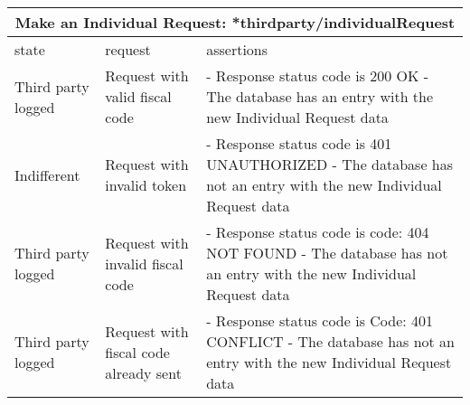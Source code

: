 \begin{center}
	\begin{tabular}{|p{}|p{}|p{}|}
		\hline
		\multicolumn{3}{c}{Make an Individual Request: *thirdparty/individualRequest}\\

		\hline
		state & request & assertions \\
		
		\hline
		Third party logged&
		Request with valid fiscal code & 
		- Response status code is 200 OK\newline
		- The database has an entry with the new Individual Request data
		\\
		
		\hline
		Indifferent&
		Request with invalid token & 
		- Response status code is 401 UNAUTHORIZED \newline
		- The database has not an entry with the new Individual Request data
		\\
		
		\hline
		Third party logged&
		Request with invalid fiscal code & 
		- Response status code is code: 404 NOT FOUND\newline
		- The database has not an entry with the new Individual Request data
		\\
		
		\hline
		Third party logged&
		Request with fiscal code already sent & 
		- Response status code is Code: 401 CONFLICT\newline
		- The database has not an entry with the new Individual Request data
		\\
		
		\hline

	\end{tabular}
\end{center}

